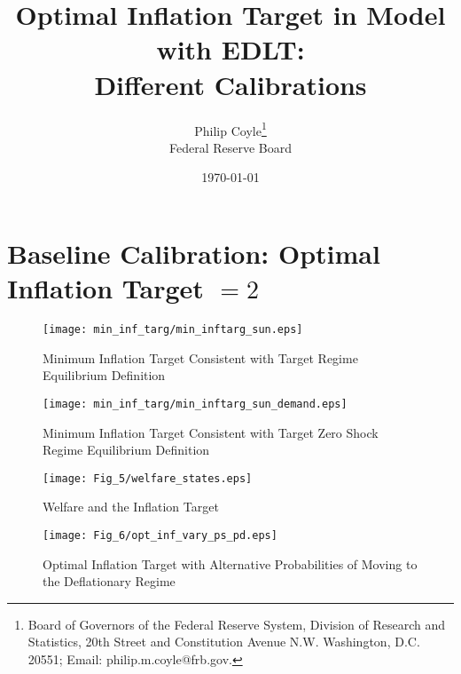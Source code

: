 \documentclass[11pt]{article}
\begin{document}
\title{Optimal Inflation Target in Model with EDLT: \\ Different Calibrations}
\author{
Philip Coyle\thanks{Board of Governors of the Federal Reserve System, Division of Research and Statistics, 20th Street and Constitution Avenue N.W. Washington, D.C. 20551; Email: philip.m.coyle@frb.gov.}\\
Federal Reserve Board
}
\date{\mydate\today}

\maketitle

\vspace{-0.3in}

\section{Baseline Calibration: Optimal Inflation Target $=2$}
\begin{figure}[!htb]
	\begin{center}
		\caption{Minimum Inflation Target Consistent with Target Regime Equilibrium Definition}
		\texttt{[image: min\_inf\_targ/min\_inftarg\_sun.eps]}\\
	\end{center}
\end{figure}
\begin{figure}[!htb]
	\begin{center}
		\caption{Minimum Inflation Target Consistent with Target Zero Shock Regime Equilibrium Definition}
		\texttt{[image: min\_inf\_targ/min\_inftarg\_sun\_demand.eps]}\\
	\end{center}
\end{figure}
\begin{figure}[!htb]
	\begin{center}
		\caption{Welfare and the Inflation Target}
		\texttt{[image: Fig\_5/welfare\_states.eps]}\\
	\end{center}
\end{figure}
\begin{figure}[!htb]
	\begin{center}
		\caption{Optimal Inflation Target with Alternative Probabilities of Moving to the Deflationary Regime}
		\texttt{[image: Fig\_6/opt\_inf\_vary\_ps\_pd.eps]}\\
	\end{center}
\end{figure}
\end{document}
